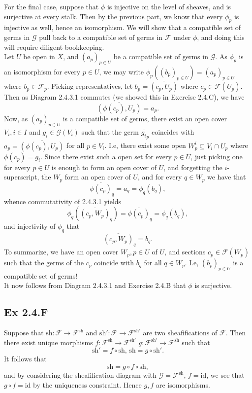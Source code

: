 \documentclass{article}
\theoremstyle{definition}
\newcommand{\id}{\text{id}}
\begin{document}
For the final case, suppose that $\phi$ is injective on the level of sheaves,
and is surjective at every stalk. Then by the previous part, we know that every
$\phi_p$ is injective as well, hence an isomorphism. We will show that a
compatible set of germs in $\mathcal{G}$ pull back to a compatible set of germs
in $\mathcal{F}$ under $\phi$, and doing this will require diligent
bookkeeping. \\

Let $U$ be open in $X$, and $(a_p)_{p \in U}$ be a compatible set of germs in
$\mathcal{G}$. As $\phi_p$ is an isomorphism for every $p \in U$, we may write
$\phi_p((b_p)_{p \in U}) = (a_p)_{p \in U}$ where $b_p \in \mathcal{F}_p$.
Picking representatives, let $b_p = \overline{(c_p, U_p)}$ where $c_p \in
\mathcal{F}(U_p)$. Then as Diagram 2.4.3.1 commutes (we showed this in Exercise
2.4.C), we have
\[
	\overline{(\phi(c_p), U_p)}
	=
	a_p.
\] 
Now, as $(a_p)_{p \in U}$ is a compatible set of germs, there exist an open
cover $V_i, i \in I$ and $g_i \in \mathcal{G}(V_i)$ such that the germ
$\overline{g_i}_p$ coincides with $a_p = \overline{(\phi(c_p), U_p)}$ for all
$p \in V_i$. I.e, there exist some open $W_{p}^{i} \subseteq V_i \cap U_p$
where $\phi(c_p) = g_i$. Since there exist such a open set for every $p \in U$,
just picking one for every $p \in U$ is enough to form an open cover of $U$,
and forgetting the $i$-superscript, the $W_p$ form an open cover of $U$, and
for every $q \in W_{p}$ we have that 
\[
	\overline{\phi(c_p)}_q = a_q = \phi_q(b_q),
\]
whence commutativity of 2.4.3.1 yields 
\[
	\phi_q(\overline{(c_p, W_p)}_q)
	=
	\overline{\phi(c_p)}_q 
	= 
	\phi_q(b_q),
\]
and injectivity of $\phi_q$ that
\[
	\overline{(c_p, W_p)}_q
	= 
	b_q.
\]
To summarize, we have an open cover $W_{p}, p \in U$ of $U$, and sections $c_p
\in \mathcal{F}(W_p)$ such that the germs of the $c_p$ coincide with $b_q$ for
all $q \in W_p$. I.e, $(b_p)_{p \in U}$ is a compatible set of germs! \\

It now follows from Diagram 2.4.3.1 and Exercise 2.4.B that $\phi$ is
surjective.

\subsection*{Ex 2.4.F}

Suppose that $\text{sh} : \mathcal{F} \to \mathcal{F}^{\text{sh}}$ and
$\text{sh}' : \mathcal{F} \to \mathcal{F}^{\text{sh}'}$ are two sheafifications
of $\mathcal{F}$. Then there exist unique morphisms $f :
\mathcal{F}^{\text{sh}} \to \mathcal{F}^{\text{sh}'}$ $g :
\mathcal{F}^{\text{sh}'} \to \mathcal{F}^{\text{sh}}$ such that  
\[
	\text{sh}' = f \circ \text{sh}, \,
	\text{sh} = g \circ \text{sh}'.
\] 
It follows that 
\[
	\text{sh} = g \circ f \circ \text{sh},
\]
and by considering the sheafification diagram with $\mathcal{G} =
\mathcal{F}^{\text{sh}}$, $f = \id$, we see that $g \circ f = \id$ by the
uniqueness constraint. Hence $g, f$ are isomorphisms.
\end{document}
